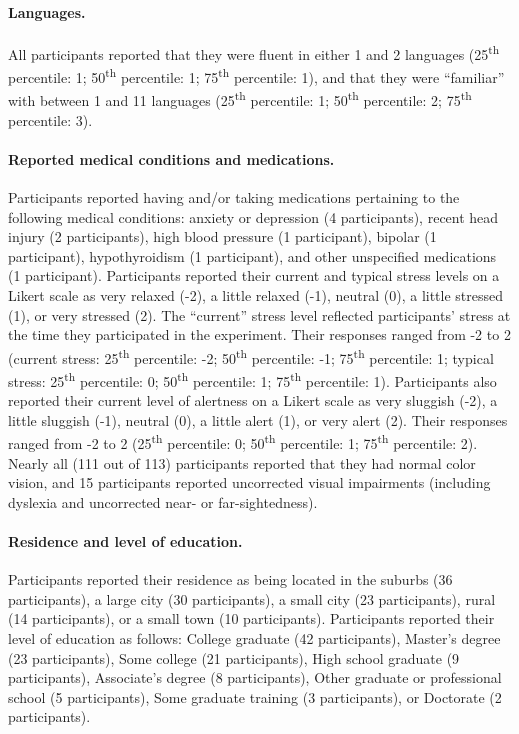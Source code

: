 \documentclass[10pt]{article}
\begin{document}
\paragraph{Languages.}
All participants reported that they were fluent in either 1 and 2
languages (25\textsuperscript{th} percentile: 1;
50\textsuperscript{th} percentile: 1; 75\textsuperscript{th}
percentile: 1), and that they were ``familiar'' with between 1 and 11
languages (25\textsuperscript{th} percentile: 1;
50\textsuperscript{th} percentile: 2; 75\textsuperscript{th}
percentile: 3).

\paragraph{Reported medical conditions and medications.}
Participants reported having and/or taking medications pertaining to the following medical conditions: anxiety or
depression (4 participants), recent head injury (2 participants), high
blood pressure (1 participant), bipolar (1 participant),
hypothyroidism (1 participant), and other unspecified medications (1
participant).  Participants reported their current and typical stress
levels on a Likert scale as very relaxed (-2), a little relaxed (-1),
neutral (0), a little stressed (1), or very stressed (2).  The
``current'' stress level reflected participants' stress at the time
they participated in the experiment.
Their responses
ranged from -2 to 2 (current stress: 25\textsuperscript{th} percentile: -2;
50\textsuperscript{th} percentile: -1; 75\textsuperscript{th}
percentile: 1; typical stress: 25\textsuperscript{th} percentile: 0;
50\textsuperscript{th} percentile: 1; 75\textsuperscript{th}
percentile: 1).  Participants also reported their current level of
alertness on a Likert scale as very sluggish (-2), a little sluggish
(-1), neutral (0), a little alert (1), or very alert (2).  Their
responses ranged from -2 to 2 (25\textsuperscript{th} percentile: 0;
50\textsuperscript{th} percentile: 1; 75\textsuperscript{th}
percentile: 2).  Nearly all (111 out of 113) participants reported
that they had normal color vision, and 15 participants reported
uncorrected visual impairments (including dyslexia and uncorrected
near- or far-sightedness).

\paragraph{Residence and level of education.}
Participants reported their residence
as being located in the suburbs (36 participants), a large city (30
participants), a small city (23 participants), rural (14
participants), or a small town (10 participants).  Participants
reported their level of education as follows: College graduate (42
participants), Master's degree (23 participants), Some college (21
participants), High school graduate (9 participants), Associate's
degree (8 participants), Other graduate or professional school (5
participants), Some graduate training (3 participants), or Doctorate
(2 participants).
\end{document}
